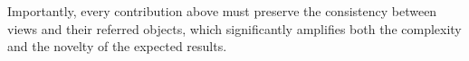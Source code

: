 Importantly, every contribution above must preserve the consistency between views and their referred objects, which significantly amplifies both the complexity and the novelty of the expected results.



%
%
